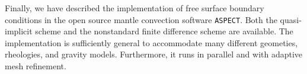 \documentclass[preprint,12pt,authoryear]{elsarticle}
\begin{document}
Finally, we have described the implementation of free surface boundary conditions in 
the open source mantle convection software \texttt{ASPECT}. Both the quasi-implicit 
scheme and the nonstandard finite difference scheme are available. The implementation is 
sufficiently general to accommodate many different geometies, rheologies, and 
gravity models. Furthermore, it runs in parallel and with adaptive mesh refinement.



 






\end{document}
